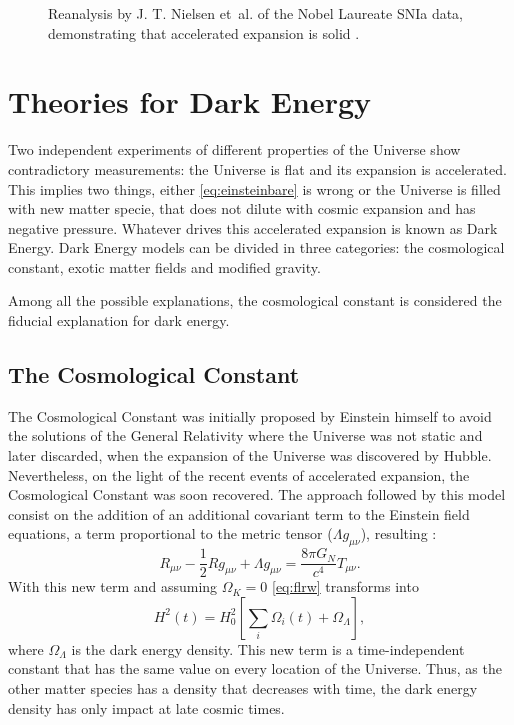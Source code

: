 \begin{figure}
\begin{center}
\caption{Reanalysis by J. T. Nielsen et~al. of the Nobel Laureate SNIa data, demonstrating that accelerated expansion is solid \cite{2016NatSR...635596N}.}
\label{fig:sarkar_SNIa}
\end{center}
\end{figure}

\section{Theories for Dark Energy}
Two independent experiments of different properties of the Universe show contradictory measurements: the Universe is flat and its expansion is accelerated. This implies two things, either \autoref{eq:einsteinbare} is wrong or the Universe is filled with new matter specie, that does not dilute with cosmic expansion and has negative pressure. Whatever drives this accelerated expansion is known as Dark Energy. Dark Energy models can be divided in three categories: the cosmological constant, exotic matter fields and modified gravity.
\newline

Among all the possible explanations, the cosmological constant is considered the fiducial explanation for dark energy.

\subsection{The Cosmological Constant}
The Cosmological Constant was initially proposed by Einstein himself \cite{1917SPAW.......142E} to avoid the solutions of the General Relativity where the Universe was not static and later discarded, when the expansion of the Universe was discovered by Hubble. Nevertheless, on the light of the recent events of accelerated expansion, the Cosmological Constant was soon recovered. The approach followed by this model consist on the addition of an additional covariant term to the Einstein field equations, a term proportional to the metric tensor ($\Lambda g_{\mu\nu}$), resulting \cite{2001LRR.....4....1C}:
\begin{equation}
R_{\mu\nu}-\frac{1}{2}Rg_{\mu\nu}+\Lambda g_{\mu\nu} = \frac{8\pi G_N}{c^4}T_{\mu\nu}.
\end{equation}
With this new term and assuming $\Omega_K=0$ \autoref{eq:flrw} transforms into
\begin{equation}
H^2(t) = H_0^2\left[\sum_i\Omega_i(t) +\Omega_\Lambda\right],
\end{equation}
where $\Omega_\Lambda$ is the dark energy density. This new term is a time-independent constant that has the same value on every location of the Universe. Thus, as the other matter species has a density that decreases with time, the dark energy density has only impact at late cosmic times.
\newline

